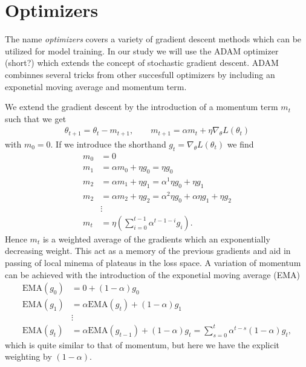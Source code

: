 

\section{Optimizers}
The name \textit{optimizers} covers a variety of gradient descent methods which can be utilized for model training. In our study we will use the ADAM optimizer (short?) which extends the concept of stochastic gradient descent. ADAM combinnes several tricks from other succesfull optimizers by including an exponetial moving average and momentum term. 


We extend the gradient descent by the introduction of a momentum term $m_t$ such that we get
\begin{align}
  \theta_{t+1} = \theta_t - m_{t+1}, \qquad m_{t+1} = \alpha m_t + \eta \nabla_\theta L(\theta_t)
  \label{eq:mom}
\end{align}
with $m_0 = 0$. If we introduce the shorthand $g_t = \nabla_\theta L(\theta_t)$ we find
\begin{align*}
  m_0 &= 0 \\
  m_1 &= \alpha m_0 + \eta g_0 = \eta g_0 \\
  m_2 &= \alpha m_1 + \eta g_1 = \alpha^1 \eta g_0 + \eta g_1 \\
  m_2 &= \alpha m_2 + \eta g_2 = \alpha^2 \eta g_0 + \alpha\eta g_1 + \eta g_2 \\
  &\vdots \\
  m_t &= \eta \left(\sum_{i=0}^{t-1} \alpha^{t-1-i}g_i\right).
\end{align*}
Hence $m_t$ is a weighted average of the gradients which an exponentially decreasing weight. This act as a memory of the previous gradients and aid in passing of local minema of plateaus in the loss space. A variation of momentum can be achieved with the introduction of the exponetial moving average (EMA)
\begin{align*}
    \text{EMA}(g_0) &= 0 + (1-\alpha)g_0 \\
    \text{EMA}(g_1) &= \alpha \text{EMA}(g_t) + (1-\alpha)g_1 \\
    &\vdots \\
    \text{EMA}(g_t) &= \alpha \text{EMA}(g_{t-1}) + (1-\alpha)g_t  = \sum_{s=0}^t \alpha^{t-s}(1-\alpha)g_t,
\end{align*}
which is quite similar to that of momentum, but here we have the explicit weighting by $(1-\alpha)$.


